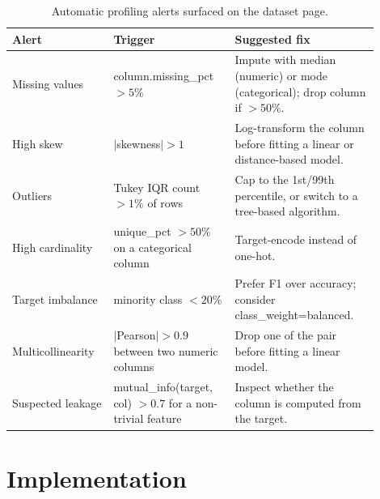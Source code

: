 \documentclass[12pt, a4paper, oneside]{report}
\begin{document}
\begin{table}[H]
\centering
\caption{Automatic profiling alerts surfaced on the dataset page.}
\label{tab:profile_alerts}
\begin{tabular}{|p{0.24\linewidth}|L{0.30\linewidth}|L{0.36\linewidth}|}
\hline
\textbf{Alert} & \textbf{Trigger} & \textbf{Suggested fix} \\
\hline
Missing values     & column.missing\_pct $> 5\%$ & Impute with median (numeric) or mode (categorical); drop column if $> 50\%$. \\ \hline
High skew          & $|$skewness$| > 1$         & Log-transform the column before fitting a linear or distance-based model. \\ \hline
Outliers           & Tukey IQR count $> 1\%$ of rows & Cap to the 1st/99th percentile, or switch to a tree-based algorithm. \\ \hline
High cardinality   & unique\_pct $> 50\%$ on a categorical column & Target-encode instead of one-hot. \\ \hline
Target imbalance   & minority class $< 20\%$    & Prefer F1 over accuracy; consider class\_weight=balanced. \\ \hline
Multicollinearity  & $|$Pearson$| > 0.9$ between two numeric columns & Drop one of the pair before fitting a linear model. \\ \hline
Suspected leakage  & mutual\_info(target, col) $> 0.7$ for a non-trivial feature & Inspect whether the column is computed from the target. \\
\hline
\end{tabular}
\end{table}

\section{Implementation}
\end{document}
